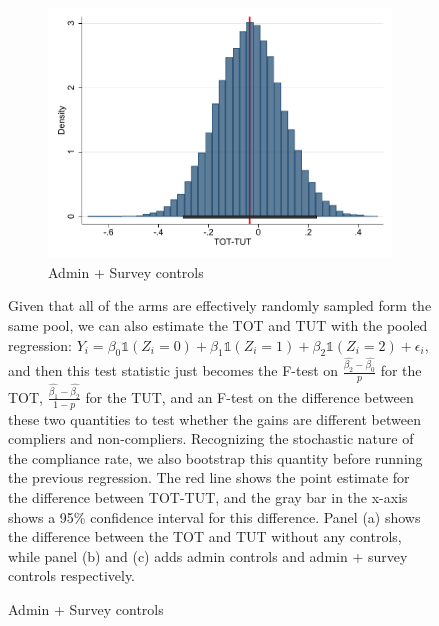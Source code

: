\documentclass[oneside,11pt]{article}
\begin{document}
\begin{figure}[H]
\begin{center}
\begin{subfigure}{0.31\textwidth}
        \caption{Admin + Survey controls}
        \centering
        \includegraphics[width=\textwidth]{Figuras/tot_tut_btsp3.pdf}
    \end{subfigure}
  
    \end{center}
     \scriptsize  Given that all of the arms are effectively randomly sampled form the same pool, we can also estimate the TOT and TUT with the pooled regression: $Y_i = \beta_0\mathds{1}(Z_i=0)+\beta_1\mathds{1}(Z_i=1)+\beta_2\mathds{1}(Z_i=2)+ \epsilon_i$, and then this test statistic just becomes the F-test on $\frac{\widehat{\beta_2}-\widehat{\beta_0}}{p}$ for the TOT, $\frac{\widehat{\beta_1}-\widehat{\beta_2}}{1-p}$ for the TUT, and an F-test on the difference between these two quantities to test whether the gains are different between compliers and non-compliers. Recognizing the stochastic nature of the compliance rate, we also bootstrap this quantity before running the previous regression. The red line shows the point estimate for the difference between TOT-TUT, and the gray bar in the x-axis shows a 95\% confidence interval for this difference. Panel (a) shows the difference between the TOT and TUT without any controls, while panel (b) and (c) adds admin controls and admin + survey controls respectively.
\end{figure}
\end{document}
